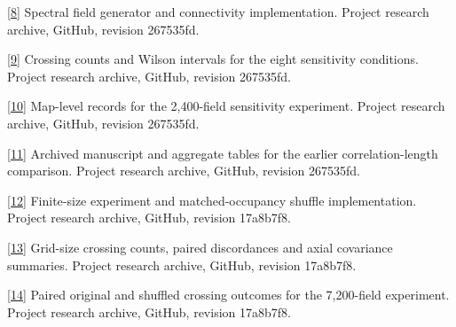 \documentclass[11pt]{article}
\begin{document}
\href{https://github.com/tejasvswipe/superconductvity-nickelate-research/blob/267535fd908d3e235b5c46d0fefe744221cf16e7/spatial_covariance_sensitivity.py}{[8]} Spectral field generator and connectivity implementation. Project research archive, GitHub, revision 267535fd.

\href{https://github.com/tejasvswipe/superconductvity-nickelate-research/blob/267535fd908d3e235b5c46d0fefe744221cf16e7/spatial_covariance_sensitivity.csv}{[9]} Crossing counts and Wilson intervals for the eight sensitivity conditions. Project research archive, GitHub, revision 267535fd.

\href{https://github.com/tejasvswipe/superconductvity-nickelate-research/blob/267535fd908d3e235b5c46d0fefe744221cf16e7/spatial_covariance_sensitivity_replicates.csv}{[10]} Map-level records for the 2,400-field sensitivity experiment. Project research archive, GitHub, revision 267535fd.

\href{https://github.com/tejasvswipe/superconductvity-nickelate-research/blob/267535fd908d3e235b5c46d0fefe744221cf16e7/spatial_percolation_manuscript_and_data.txt}{[11]} Archived manuscript and aggregate tables for the earlier correlation-length comparison. Project research archive, GitHub, revision 267535fd.

\href{https://github.com/tejasvswipe/superconductvity-nickelate-research/blob/17a8b7f801d3c105c6ebfdf49bf1fe5b6fae62b0/finite_size_control.py}{[12]} Finite-size experiment and matched-occupancy shuffle implementation. Project research archive, GitHub, revision 17a8b7f8.

\href{https://github.com/tejasvswipe/superconductvity-nickelate-research/blob/17a8b7f801d3c105c6ebfdf49bf1fe5b6fae62b0/finite_size_results/summary.csv}{[13]} Grid-size crossing counts, paired discordances and axial covariance summaries. Project research archive, GitHub, revision 17a8b7f8.

\href{https://github.com/tejasvswipe/superconductvity-nickelate-research/blob/17a8b7f801d3c105c6ebfdf49bf1fe5b6fae62b0/finite_size_results/maps.csv}{[14]} Paired original and shuffled crossing outcomes for the 7,200-field experiment. Project research archive, GitHub, revision 17a8b7f8.
\end{document}
